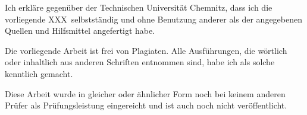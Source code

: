 \begin{tucerklaerung}
  Ich erkläre gegenüber der Technischen Universität Chemnitz, dass ich die
  vorliegende XXX\ selbstständig und ohne Benutzung anderer
  als der angegebenen Quellen und Hilfsmittel angefertigt habe.

  Die vorliegende Arbeit ist frei von Plagiaten. Alle Ausführungen, die wörtlich
  oder inhaltlich aus anderen Schriften entnommen sind, habe ich als solche
  kenntlich gemacht.

  Diese Arbeit wurde in gleicher oder ähnlicher Form noch bei keinem anderen
  Prüfer als Prüfungsleistung eingereicht und ist auch noch nicht veröffentlicht.

\end{tucerklaerung}

